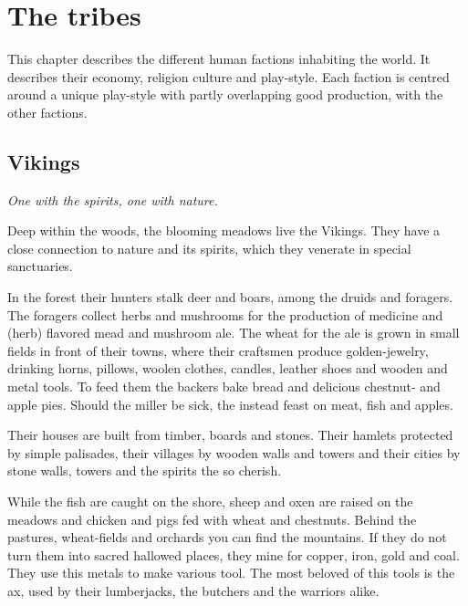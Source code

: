 \documentclass[a4paper]{book}
\title{\Title}
\author{\Author}
\begin{document}
\maketitle

\tableofcontents

\chapter{The tribes}
This chapter describes the different human factions inhabiting the world.
It describes their economy, religion culture and play-style.
Each faction is centred around a unique play-style with partly overlapping good production,
with the other factions.

\section{\Gls{Vikings}}

	\begin{flushright}
		\emph{One with the spirits, one with nature.}
	\end{flushright}

	Deep within the woods, the blooming meadows live the \gls{Vikings}.
	They have a close connection to nature and its spirits,
	which they venerate in special sanctuaries.

	In the forest their hunters stalk deer and boars,
	among the druids and foragers.
	The foragers collect herbs and mushrooms for the production
	of medicine and (herb) flavored mead and mushroom ale.
	The wheat for the ale is grown in small fields in front of their towns,
	where their craftsmen produce golden-jewelry, drinking horns, pillows,
	woolen clothes, candles, leather shoes and wooden and metal tools.
	To feed them the backers bake bread and delicious chestnut- and apple pies.
	Should the miller be sick, the instead feast on meat, fish and apples.

	Their houses are built from timber, boards and stones.
	Their hamlets protected by simple palisades,
	their villages by wooden walls and towers and their cities by stone walls, towers
	and the spirits the so cherish.

	While the fish are caught on the shore, sheep and oxen
	are raised on the meadows and chicken and pigs fed with wheat and chestnuts.
	Behind the pastures, wheat-fields and orchards you can find the mountains.
	If they do not turn them into sacred hallowed places,
	they mine for copper, iron, gold and coal.
	They use this metals to make various tool.
	The most beloved of this tools is the ax, used by their lumberjacks,
	the butchers and the warriors alike.
\end{document}
